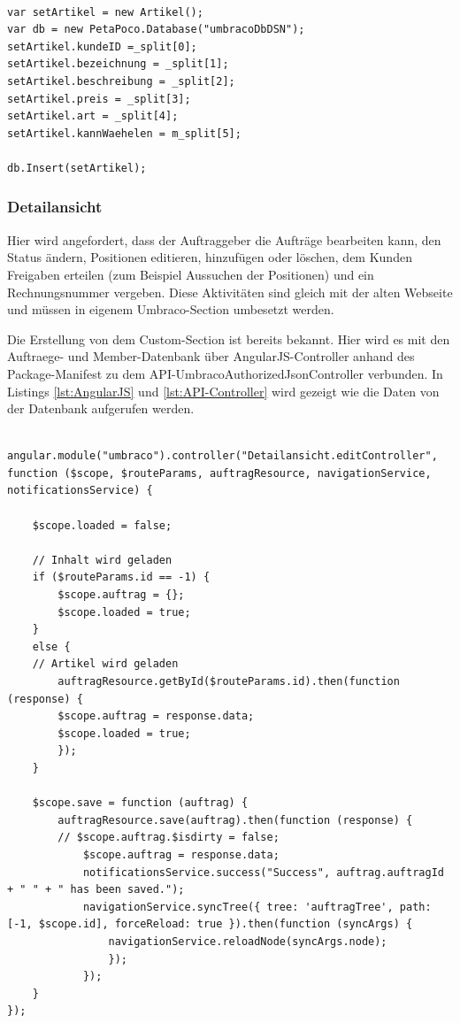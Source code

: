 \begin{lstlisting}[caption={Datenbank "Artikel" - Transfer}, label=lst:DBInputArtikel]

var setArtikel = new Artikel();
var db = new PetaPoco.Database("umbracoDbDSN");
setArtikel.kundeID =_split[0];
setArtikel.bezeichnung = _split[1];
setArtikel.beschreibung = _split[2];
setArtikel.preis = _split[3];
setArtikel.art = _split[4];
setArtikel.kannWaehelen = m_split[5];

db.Insert(setArtikel);
\end{lstlisting}

\subsubsection{Detailansicht}

Hier wird angefordert, dass der Auftraggeber die Aufträge bearbeiten kann, den Status ändern, Positionen editieren, hinzufügen oder löschen, dem Kunden Freigaben erteilen (zum Beispiel Aussuchen der Positionen) und ein Rechnungsnummer vergeben. Diese Aktivitäten sind gleich mit der alten Webseite und müssen in eigenem Umbraco-Section umbesetzt werden. 

Die Erstellung von dem Custom-Section ist bereits bekannt. Hier wird es mit den Auftraege- und Member-Datenbank über AngularJS-Controller anhand des Package-Manifest zu dem API-UmbracoAuthorizedJsonController verbunden. In Listings \ref{lst:AngularJS} und \ref{lst:API-Controller} wird gezeigt wie die Daten von der Datenbank aufgerufen werden.

\begin{lstlisting}[caption={AngularJS-Controller ruft die zugeordnete Methoden im API-Controller}, label=lst:AngularJS]

angular.module("umbraco").controller("Detailansicht.editController", function ($scope, $routeParams, auftragResource, navigationService, notificationsService) {

	$scope.loaded = false;

	// Inhalt wird geladen
	if ($routeParams.id == -1) {
		$scope.auftrag = {};
		$scope.loaded = true;
	}
	else {
	// Artikel wird geladen
		auftragResource.getById($routeParams.id).then(function (response) {
		$scope.auftrag = response.data;
		$scope.loaded = true;
		});
	}

	$scope.save = function (auftrag) {
		auftragResource.save(auftrag).then(function (response) {
		// $scope.auftrag.$isdirty = false;
			$scope.auftrag = response.data;
			notificationsService.success("Success", auftrag.auftragId + " " + " has been saved.");
			navigationService.syncTree({ tree: 'auftragTree', path: [-1, $scope.id], forceReload: true }).then(function (syncArgs) {
				navigationService.reloadNode(syncArgs.node);
				});
			});
	}
});
\end{lstlisting}

